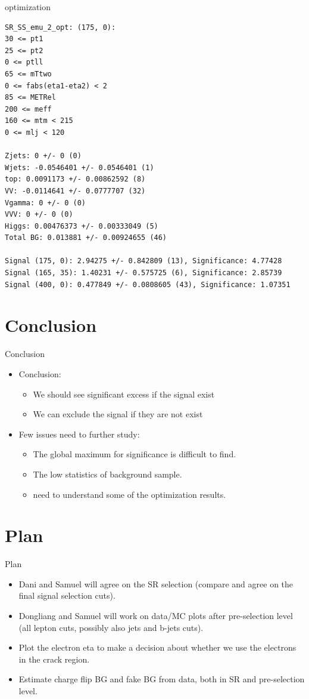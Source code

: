 \documentclass[mathserif,serif]{beamer}
\begin{document}
\begin{frame}[fragile]{optimization}
\tiny
\begin{verbatim}
SR_SS_emu_2_opt: (175, 0):
30 <= pt1
25 <= pt2
0 <= ptll
65 <= mTtwo
0 <= fabs(eta1-eta2) < 2
85 <= METRel
200 <= meff
160 <= mtm < 215
0 <= mlj < 120

Zjets: 0 +/- 0 (0)
Wjets: -0.0546401 +/- 0.0546401 (1)
top: 0.0091173 +/- 0.00862592 (8)
VV: -0.0114641 +/- 0.0777707 (32)
Vgamma: 0 +/- 0 (0)
VVV: 0 +/- 0 (0)
Higgs: 0.00476373 +/- 0.00333049 (5)
Total BG: 0.013881 +/- 0.00924655 (46)

Signal (175, 0): 2.94275 +/- 0.842809 (13), Significance: 4.77428
Signal (165, 35): 1.40231 +/- 0.575725 (6), Significance: 2.85739
Signal (400, 0): 0.477849 +/- 0.0808605 (43), Significance: 1.07351
\end{verbatim}
\end{frame}

\section{Conclusion}
\begin{frame}{Conclusion}
\begin{itemize}
\item Conclusion:
\begin{itemize}
\item We should see significant excess if the signal exist
\item We can exclude the signal if they are not exist
\end{itemize}
\item Few issues need to further study:
\begin{itemize}
\item The global maximum for significance is difficult to find.
\item The low statistics of background sample.
\item need to understand some of the optimization results.
\end{itemize}
\end{itemize}
\end{frame}

\section{Plan}
\begin{frame}{Plan}
\begin{itemize}
\item Dani and Samuel will agree on the SR selection (compare and agree on the final signal selection cuts).
\item Dongliang and Samuel will work on data/MC plots after pre-selection level (all lepton cuts, possibly also jets and b-jets cuts).
\item Plot the electron eta to make a decision about whether we use the electrons in the crack region.
\item Estimate charge flip BG and fake BG from data, both in SR and pre-selection level.
\end{itemize}
\end{frame}
\end{document}
